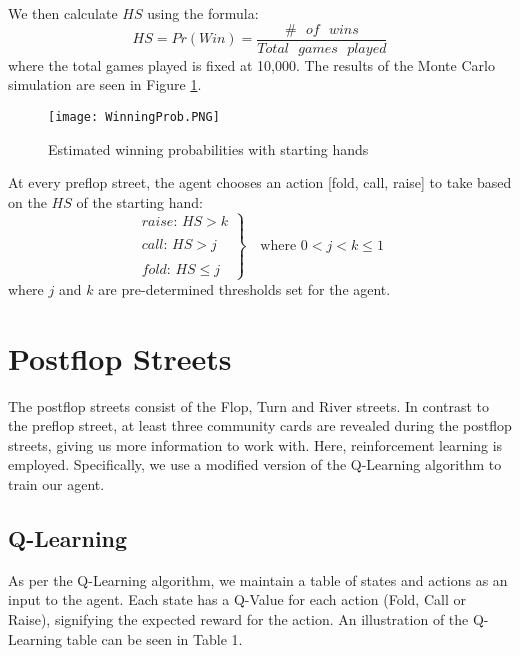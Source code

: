\documentclass{article}
\begin{document}
We then calculate $HS$ using the formula:
\begin{displaymath}
 HS = Pr(Win)= \frac{\# \text{ } of \text{ } wins}{Total \text{ }games \text{ } played}
\end{displaymath}
where the total games played is fixed at 10,000. The results of the Monte Carlo simulation are seen in Figure \ref{fig:1}.
\begin{figure}
  \texttt{[image: WinningProb.PNG]}
  \caption{Estimated winning probabilities with starting hands}
  \label{fig:1}
\end{figure}

At every preflop street, the agent chooses an action [fold, call, raise] to take based on the $HS$ of the starting hand:
\begin{displaymath}
  \left.
  \begin{array}{l}
    raise \text{: } HS > k \\
    \\
    call \text{: } HS > j \\
    \\
    fold \text{: } HS \leq j
  \end{array}
  \right\rbrace \quad \text{where } 0 < j < k \leq 1
\end{displaymath}
where $j$ and $k$ are pre-determined thresholds set for the agent.

\section{Postflop Streets}

The postflop streets consist of the Flop, Turn and River streets. In contrast to the preflop street, at least three community cards are revealed during the postflop streets, giving us more information to work with. Here, reinforcement learning is employed. Specifically, we use a modified version of the Q-Learning algorithm to train our agent.

\subsection{Q-Learning}

As per the Q-Learning algorithm, we maintain a table of states and actions as an input to the agent. Each state has a Q-Value for each action (Fold, Call or Raise), signifying the expected reward for the action. An illustration of the Q-Learning table can be seen in Table 1.
\end{document}
